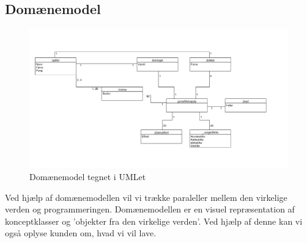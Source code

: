     \subsection{Domænemodel}
        \begin{figure}[h]
            \advance\leftskip-3cm
            \includegraphics[width=20cm]{fig/dtu/domainmodel.jpg}
            \caption{Domænemodel tegnet i UMLet}
        \end{figure}
    Ved hjælp af domænemodellen vil vi trække paraleller mellem den virkelige
    verden og programmeringen. Domænemodellen er en visuel repræsentation af 
    konceptklasser og 'objekter fra den virkelige verden'. Ved hjælp af denne
    kan vi også oplyse kunden om, hvad vi vil lave.
